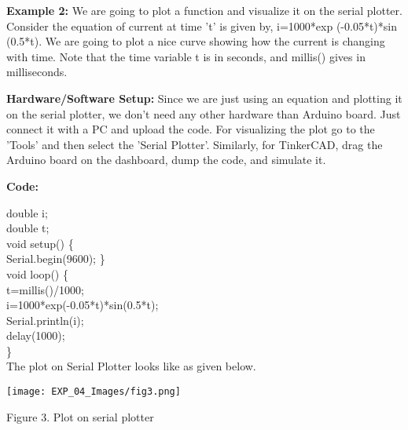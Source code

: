 \documentclass[12pt,a4paper]{article}
\begin{document}
\setlength{\parindent}{0eM}
\begin{justify}
\noindent \textbf{Example 2:} We are going to plot a function and visualize it on the serial plotter. Consider the equation of current at time 't' is given by, i=1000*exp (-0.05*t)*sin (0.5*t). We are going to plot a nice curve showing how the current is changing with time. Note that the time variable t is in seconds, and millis() gives in milliseconds.\par
\noindent \textbf{Hardware/Software Setup:} Since we are just using an equation and plotting it on the serial plotter, we don't need any other hardware than Arduino board. Just connect it with a PC and upload the code. For visualizing the plot go to the 'Tools' and then select the 'Serial Plotter'. Similarly, for TinkerCAD, drag the Arduino board on the dashboard, dump the code, and simulate it.
\end{justify}
\vspace{-5mm}
\hspace{1.5cm}\textbf{\large Code:}\\[6pt]
\setlength{\parindent}{8eM}

  double i;\\
  double t;\\
  void setup() \{\\
  Serial.begin(9600); \}\\
  void loop() \{\\
  t=millis()/1000;\\
  i=1000*exp(-0.05*t)*sin(0.5*t);\\
  Serial.println(i);\\
  delay(1000);\\
  \}\\[9pt]

The plot on Serial Plotter looks like as given below.
\vspace{-4mm}
\begin{center} 
\texttt{[image: EXP\_04\_Images/fig3.png]}
\end{center}
\vspace{-7mm}
\begin{center} {Figure 3. Plot on serial plotter}\end{center}
\vspace{-3mm}
\end{document}
